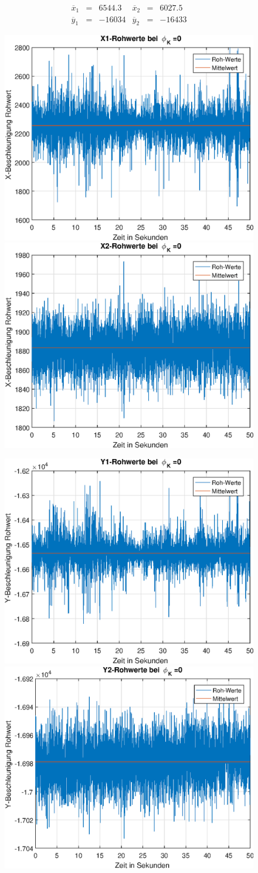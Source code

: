 \documentclass{article}
\begin{document}
\begin{equation}
\begin{array}{lclclcl}
\overline{x}_1 &=& 6544.3 & \overline{x}_2 &=& 6027.5 \\
\overline{y}_1 &=& -16034 & \overline{y}_2 &=& -16433
\end{array}
\end{equation}
\newpage
\begin{figure}[h]
	\includegraphics[width=0.5\linewidth]{img/phiK0_x1_raw.eps}
	\includegraphics[width=0.5\linewidth]{img/phiK0_x2_raw.eps}
\end{figure}
\begin{figure}[h]
	\includegraphics[width=0.5\linewidth]{img/phiK0_y1_raw.eps}
	\includegraphics[width=0.5\linewidth]{img/phiK0_y2_raw.eps}
\end{figure}
\end{document}

